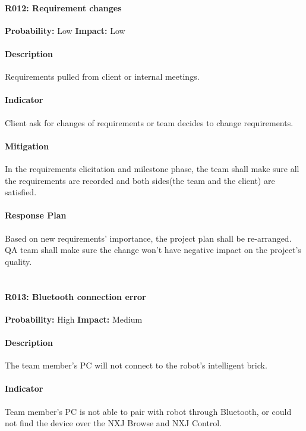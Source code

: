 \documentclass[11pt, a4paper]{report}
\begin{document}
	\paragraph{R012: Requirement changes} \hspace{1cm} \textbf{Probability: }Low\hspace{1cm}   \textbf{Impact: }Low
	\paragraph{Description}Requirements pulled from client or internal meetings.
	\paragraph{Indicator}Client ask for changes of requirements or team decides to change requirements.  
	\paragraph{Mitigation}In the requirements elicitation and milestone phase, the team shall make sure all the requirements are recorded and both sides(the team and the client) are satisfied.
	\paragraph{Response Plan}Based on new requirements' importance, the project plan shall be re-arranged. QA team shall make sure the change won't have negative impact on the project's quality. \\\\

	\paragraph{R013: Bluetooth connection error} \hspace{1cm} \textbf{Probability: }High\hspace{1cm}   \textbf{Impact: }Medium
	\paragraph{Description}The team member's PC will not connect to the robot's intelligent brick.
	\paragraph{Indicator}Team member's PC is not able to pair with robot through Bluetooth, or could not find the device over the NXJ Browse and NXJ Control. 
\end{document}
